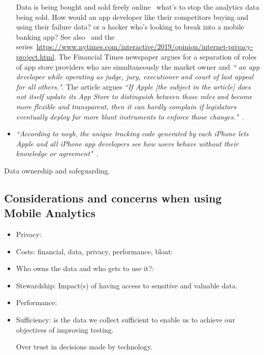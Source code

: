 \begin{itemize}
    Data is being bought and sold freely online~ what's to stop the analytics data being sold. How would an app developer like their competitors buying and using their failure data? or a hacker who's looking to break into a mobile banking app? See also~ and the series~\url{https://www.nytimes.com/interactive/2019/opinion/internet-privacy-project.html}. The Financial Times newspaper argues for a separation of roles of app store providers who are simultaneously the market owner and \emph{`` an app developer while operating as judge, jury, executioner and court of last appeal for all others."}. The article argues \emph{``If Apple [the subject in the article] does not itself update its App Store to distinguish between those roles and become more flexible and transparent, then it can hardly complain if legislators eventually deploy far more blunt instruments to enforce those changes."}~.
    \item \emph{``According to noyb, the unique tracking code generated by each iPhone lets Apple and all iPhone app developers see how users behave without their knowledge or agreement"}~.
\end{itemize}
\afterpage{\clearpage}

Data ownership and safeguarding.

\subsection{Considerations and concerns when using Mobile Analytics}
\begin{itemize}
    \item Privacy:
    \item Costs: financial, data, privacy, performance, bloat:
    \item Who owns the data and who gets to use it?:
    \item Stewardship: Impact(s) of having access to sensitive and valuable data.
    \item Performance:
    \item Sufficiency: is the data we collect sufficient to enable us to achieve our objectives of improving testing.
    \item [Over] trust in decisions made by technology.
\end{itemize}




